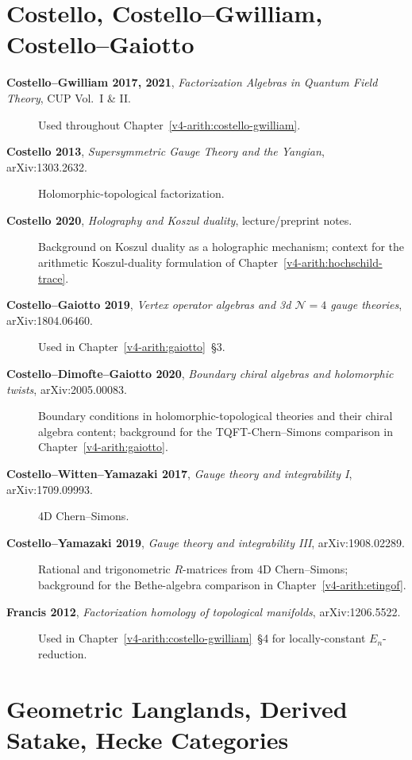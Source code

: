 \section{Costello, Costello--Gwilliam, Costello--Gaiotto}
\label{v4-arith:app:A:costello}

\begin{description}
\item[\textbf{Costello--Gwilliam 2017, 2021}, \emph{Factorization
Algebras in Quantum Field Theory}, CUP Vol.~I \& II.] Used
throughout Chapter~\ref{v4-arith:costello-gwilliam}.
\item[\textbf{Costello 2013}, \emph{Supersymmetric Gauge Theory and
the Yangian}, arXiv:1303.2632.] Holomorphic-topological factorization.
\item[\textbf{Costello 2020}, \emph{Holography and Koszul duality},
lecture/preprint notes.] Background on Koszul duality as a
holographic mechanism; context for the arithmetic Koszul-duality
formulation of Chapter~\ref{v4-arith:hochschild-trace}.
\item[\textbf{Costello--Gaiotto 2019}, \emph{Vertex operator
algebras and 3d \(\mathcal{N}=4\) gauge theories}, arXiv:1804.06460.]
Used in Chapter~\ref{v4-arith:gaiotto}~\S3.
\item[\textbf{Costello--Dimofte--Gaiotto 2020}, \emph{Boundary
chiral algebras and holomorphic twists}, arXiv:2005.00083.]
Boundary conditions in holomorphic-topological theories and their
chiral algebra content; background for the TQFT-Chern--Simons
comparison in Chapter~\ref{v4-arith:gaiotto}.
\item[\textbf{Costello--Witten--Yamazaki 2017}, \emph{Gauge theory
and integrability I}, arXiv:1709.09993.] 4D Chern--Simons.
\item[\textbf{Costello--Yamazaki 2019}, \emph{Gauge theory and
integrability III}, arXiv:1908.02289.] Rational and trigonometric
\(R\)-matrices from 4D Chern--Simons; background for the
Bethe-algebra comparison in Chapter~\ref{v4-arith:etingof}.
\item[\textbf{Francis 2012}, \emph{Factorization homology of
topological manifolds}, arXiv:1206.5522.] Used in
Chapter~\ref{v4-arith:costello-gwilliam}~\S4 for locally-constant
\(E_{n}\)-reduction.
\end{description}

\section{Geometric Langlands, Derived Satake, Hecke Categories}
\label{v4-arith:app:A:langlands}

